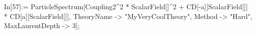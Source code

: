In[57]:= ParticleSpectrum[Coupling2^2 * ScalarField[]^2 + CD[-a][ScalarField[]] * CD[a][ScalarField[]], TheoryName -> "MyVeryCoolTheory", Method -> "Hard", MaxLaurentDepth -> 3]; 